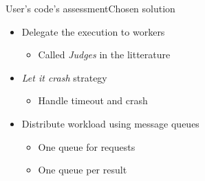 \documentclass{beamer}
\begin{document}
\begin{frame}{User's code's assessment}{Chosen solution}
  \begin{itemize}
  \item {
    Delegate the execution to workers
    \begin{itemize}
    \item Called \emph{Judges} in the litterature
    \end{itemize}
    \pause
  }
  \item {
    \emph{Let it crash} strategy
    \begin{itemize}
    \item Handle timeout and crash
    \end{itemize}
    \pause
  }
  \item {
    Distribute workload using message queues
    \begin{itemize}
    \item One queue for requests
    \item One queue per result
    \end{itemize}
  }
  \end{itemize}
\end{frame}
\end{document}
